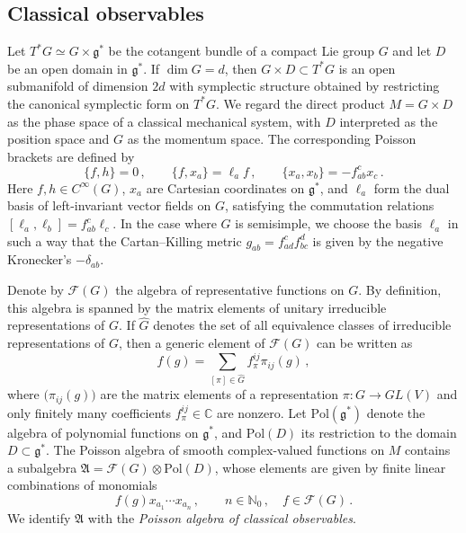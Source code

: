 \documentclass[12pt,a4paper]{article}
\numberwithin{equation}{section}
\theoremstyle{theorem}
\theoremstyle{remark}
\newcommand{\fg}{\mathcal{F}(G)}
\newcommand{\gs}{\mathfrak{g}^\ast}
\newcommand{\fa}{\mathfrak{A}}
\newcommand{\pol}{\mathrm{Pol}(\mathfrak{g}^\ast )}
\newcommand{\pold}{\mathrm{Pol}(D )}
\begin{document}
\subsection{Classical observables} 

Let $T^\ast G\simeq G\times \gs$ be the cotangent bundle of a compact Lie group $G$ and let $D$ be an open domain in $\gs$. If $\dim G=d$, then $G\times D\subset T^\ast G$ is an open submanifold of dimension $2d$ with symplectic structure obtained by restricting the canonical symplectic form on $T^\ast G$.  We regard the direct product $M=G\times D$ as the phase space of a classical mechanical system, with $D$ interpreted as the position space and  $G$ as the momentum space. The corresponding Poisson brackets are defined by
\begin{equation}
    \{f, h\}=0\,,\qquad \{f, x_a\}=\ell_af\,,\qquad \{x_a,x_b\}=-f_{ab}^cx_c\,.
\end{equation}
Here $f, h\in C^\infty(G)$, $x_a$ are Cartesian coordinates on $\gs$, and  $\ell_a$ form the dual basis of left-invariant vector fields on $G$, satisfying the commutation relations $[\ell_a,\ell_b]=f_{ab}^c\ell_c$. In the case where  $G$ is semisimple, we choose the basis $\ell_a$ in such a way that the Cartan--Killing metric $g_{ab}=f^c_{ad}f^d_{bc}$ is given by the negative Kronecker's $-\delta_{ab}$. 


Denote by $\fg$ the algebra of representative functions on $G$. By definition,  this algebra is spanned by the matrix elements of unitary irreducible representations of $G$. If $\hat G$ denotes the set of all equivalence classes of irreducible representations of $G$, then a generic element of $\fg$ can be written as
\begin{equation}
    f(g)=\sum_{[\pi]\in \hat G}f_\pi^{ij}\pi_{ij}(g)\,,
\end{equation}
where $\big(\pi_{ij}(g)\big)$ are the matrix elements of a representation $\pi: G\rightarrow GL(V)$ and only finitely many coefficients $f_\pi^{ij}\in \mathbb{C}$ are nonzero. Let $\pol$ denote the algebra of polynomial functions on $\gs$, and $\pold$ its restriction to the domain $D\subset \gs$. 
The Poisson algebra of smooth complex-valued functions on $M$ contains a subalgebra $\fa=\fg\otimes \pold$, whose elements are given by finite linear combinations of monomials 
\begin{equation}
    f(g)x_{a_1}\cdots x_{a_n} \,,\qquad n\in \mathbb{N}_0\,,\quad f\in \fg\,.
    \end{equation}
We identify $\fa$ with the {\it Poisson algebra of classical observables}. 
\end{document}
